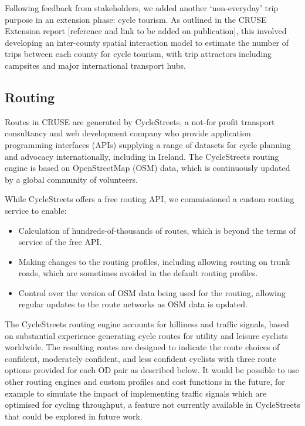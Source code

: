 \documentclass[
  super,
  preprint,
  3p]{elsarticle}
\providecommand{\tightlist}{%
  \setlength{\itemsep}{0pt}\setlength{\parskip}{0pt}}\usepackage{longtable,booktabs,array}
\begin{document}
\endgroup{}

Following feedback from stakeholders, we added another `non-everyday'
trip purpose in an extension phase: cycle tourism. As outlined in the
CRUSE Extension report {[}reference and link to be added on
publication{]}, this involved developing an inter-county spatial
interaction model to estimate the number of trips between each county
for cycle tourism, with trip attractors including campsites and major
international transport hubs.

\subsection{Routing}\label{routing}

Routes in CRUSE are generated by CycleStreets, a not-for profit
transport consultancy and web development company who provide
application programming interfaces (APIs) supplying a range of datasets
for cycle planning and advocacy internationally, including in Ireland.
The CycleStreets routing engine is based on OpenStreetMap (OSM) data,
which is continuously updated by a global community of volunteers.

While CycleStreets offers a free routing API, we commissioned a custom
routing service to enable:

\begin{itemize}
\tightlist
\item
  Calculation of hundreds-of-thousands of routes, which is beyond the
  terms of service of the free API.
\item
  Making changes to the routing profiles, including allowing routing on
  trunk roads, which are sometimes avoided in the default routing
  profiles.
\item
  Control over the version of OSM data being used for the routing,
  allowing regular updates to the route networks as OSM data is updated.
\end{itemize}

The CycleStreets routing engine accounts for hilliness and traffic
signals, based on substantial experience generating cycle routes for
utility and leisure cyclists worldwide. The resulting routes are
designed to indicate the route choices of confident, moderately
confident, and less confident cyclists with three route options provided
for each OD pair as described below. It would be possible to use other
routing engines and custom profiles and cost functions in the future,
for example to simulate the impact of implementing traffic signals which
are optimised for cycling throughput, a feature not currently available
in CycleStreets that could be explored in future work.
\end{document}
